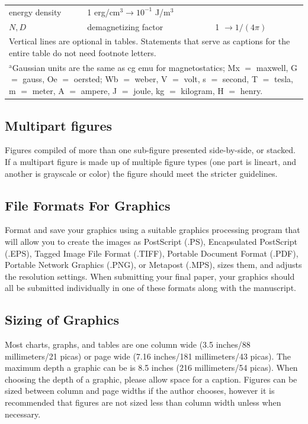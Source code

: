 \documentclass{ieeeaccess}
\begin{document}
\begin{table}
\begin{tabular}{|p{25pt}|p{75pt}|p{115pt}|}
energy density&
1 erg/cm$^{3} \to  10^{-1}$ J/m$^{3}$ \\
$N, D$&
demagnetizing factor&
1 $\to  1/(4\pi )$ \\
\hline
\multicolumn{3}{p{251pt}}{Vertical lines are optional in tables. Statements that serve as captions for
the entire table do not need footnote letters. }\\
\multicolumn{3}{p{251pt}}{$^{\mathrm{a}}$Gaussian units are the same as cg emu for magnetostatics; Mx
$=$ maxwell, G $=$ gauss, Oe $=$ oersted; Wb $=$ weber, V $=$ volt, s $=$
second, T $=$ tesla, m $=$ meter, A $=$ ampere, J $=$ joule, kg $=$
kilogram, H $=$ henry.}
\end{tabular}
\label{tab1}
\end{table}

\subsection{Multipart figures}
Figures compiled of more than one sub-figure presented side-by-side, or
stacked. If a multipart figure is made up of multiple figure
types (one part is lineart, and another is grayscale or color) the figure
should meet the stricter guidelines.

\subsection{File Formats For Graphics}\label{formats}
Format and save your graphics using a suitable graphics processing program
that will allow you to create the images as PostScript (.PS), Encapsulated
PostScript (.EPS), Tagged Image File Format (.TIFF), Portable Document
Format (.PDF), Portable Network Graphics (.PNG), or Metapost (.MPS), sizes them, and adjusts
the resolution settings. When
submitting your final paper, your graphics should all be submitted
individually in one of these formats along with the manuscript.

\subsection{Sizing of Graphics}
Most charts, graphs, and tables are one column wide (3.5 inches/88
millimeters/21 picas) or page wide (7.16 inches/181 millimeters/43
picas). The maximum depth a graphic can be is 8.5 inches (216 millimeters/54
picas). When choosing the depth of a graphic, please allow space for a
caption. Figures can be sized between column and page widths if the author
chooses, however it is recommended that figures are not sized less than
column width unless when necessary.
\end{document}
